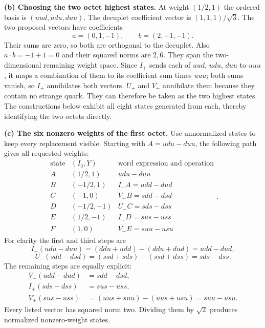 \textbf{(b) Choosing the two octet highest states.}
At weight $(1/2,1)$ the ordered basis is $(uud,udu,duu)$.
The decuplet coefficient vector is $(1,1,1)/\sqrt3$.
The two proposed vectors have coefficients
\[
a=(0,1,-1),\qquad b=(2,-1,-1).
\]
Their sums are zero, so both are orthogonal to the decuplet.
Also $a\cdot b=-1+1=0$ and their squared norms are $2,6$.
They span the two-dimensional remaining weight space.
Since $I_+$ sends each of $uud$, $udu$, $duu$ to $uuu$, it maps a
combination of them to its coefficient sum times $uuu$; both sums
vanish, so $I_+$ annihilates both vectors. $U_+$ and $V_+$
annihilate them because they contain no strange quark.
They can therefore be taken as the two highest states.
The constructions below exhibit all eight states generated from
each, thereby identifying the two octets directly.

\textbf{(c) The six nonzero weights of the first octet.}
Use unnormalized states to keep every replacement visible.
Starting with $A=udu-duu$, the following path gives all requested
weights:
\[
\begin{array}{c|c|l}
\text{state}&(I_3,Y)&\text{word expression and operation}\\\hline
A&(1/2,1)&udu-duu\\
B&(-1/2,1)&I_-A=udd-dud\\
C&(-1,0)&V_-B=sdd-dsd\\
D&(-1/2,-1)&U_-C=sds-dss\\
E&(1/2,-1)&I_+D=sus-uss\\
F&(1,0)&V_+E=suu-usu
\end{array}.
\]
For clarity the first and third steps are
\[
I_-(udu-duu)
=(ddu+udd)-(ddu+dud)=udd-dud,
\]
\[
U_-(sdd-dsd)
=(ssd+sds)-(ssd+dss)=sds-dss.
\]
The remaining steps are equally explicit:
\[
\begin{aligned}
V_-(udd-dud)&=sdd-dsd,\\
I_+(sds-dss)&=sus-uss,\\
V_+(sus-uss)&=(uus+suu)-(uus+usu)=suu-usu.
\end{aligned}
\]
Every listed vector has squared norm two. Dividing them by
$\sqrt2$ produces normalized nonzero-weight states.


